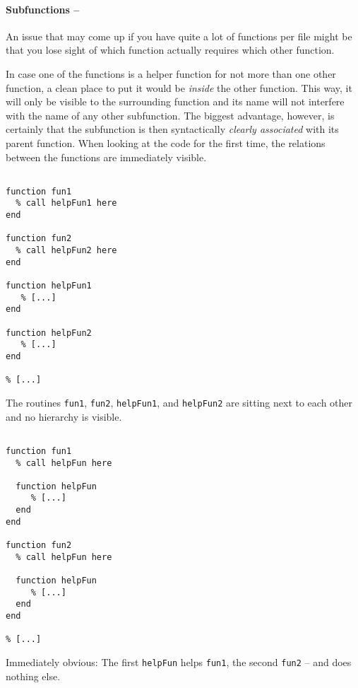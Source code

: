 \paragraph{Subfunctions -- \cleansymbol\cleansymbol}
An issue that may come up if you have quite a lot of functions per file might
be that you lose sight of which function actually requires which other
function.

In case one of the functions is a helper function for not more than one other
function, a clean place to put it would be \emph{inside} the other function.
This way, it will only be visible to the surrounding function and its name
will not interfere with the name of any other subfunction. The biggest
advantage, however, is certainly that the subfunction is then syntactically
\emph{clearly associated} with its parent function. When looking at the code
for the first time, the relations between the functions are immediately
visible.


\hfill
\begin{minipage}[t]{.45\textwidth}
\begin{lstlisting}[framerule=2pt,rulecolor=\color{badred}]
% [...]

function fun1
  % call helpFun1 here
end

function fun2
  % call helpFun2 here
end

function helpFun1
   % [...]
end

function helpFun2
   % [...]
end

% [...]
\end{lstlisting}
The routines \lstinline!fun1!, \lstinline!fun2!, \lstinline!helpFun1!, and \lstinline!helpFun2! are sitting next to each other and no hierarchy is visible.
\end{minipage}
\hfill
\begin{minipage}[t]{.45\textwidth}
\begin{lstlisting}[framerule=2pt,rulecolor=\color{goodgreen}]
% [...]

function fun1
  % call helpFun here

  function helpFun
     % [...]
  end
end

function fun2
  % call helpFun here

  function helpFun
     % [...]
  end
end

% [...]
\end{lstlisting}
Immediately obvious: The first \lstinline!helpFun! helps \lstinline!fun1!, the
second \lstinline!fun2! -- and does nothing else.
\end{minipage}
\hfill

